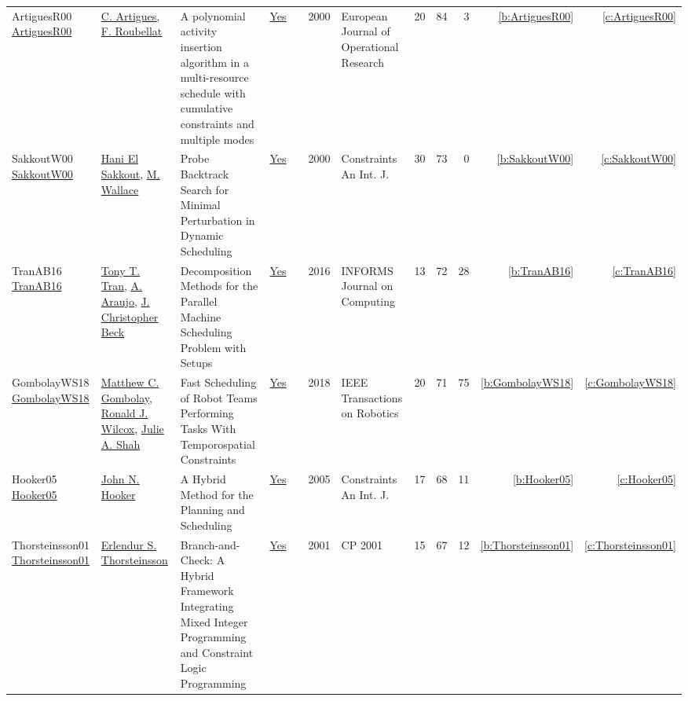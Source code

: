 {\begin{longtable}{>{\raggedright\arraybackslash}p{3cm}>{\raggedright\arraybackslash}p{6cm}>{\raggedright\arraybackslash}p{6.5cm}rrrp{2.5cm}rrrrr}
ArtiguesR00 \href{https://doi.org/10.1016/S0377-2217(99)00496-8}{ArtiguesR00} & \hyperref[auth:a6]{C. Artigues}, \hyperref[auth:a721]{F. Roubellat} & A polynomial activity insertion algorithm in a multi-resource schedule with cumulative constraints and multiple modes & \href{../works/ArtiguesR00.pdf}{Yes} & \cite{ArtiguesR00} & 2000 & European Journal of Operational Research & 20 & 84 & 3 & \ref{b:ArtiguesR00} & \ref{c:ArtiguesR00}\\
SakkoutW00 \href{https://doi.org/10.1023/A:1009856210543}{SakkoutW00} & \hyperref[auth:a168]{Hani El Sakkout}, \hyperref[auth:a117]{M. Wallace} & Probe Backtrack Search for Minimal Perturbation in Dynamic Scheduling & \href{../works/SakkoutW00.pdf}{Yes} & \cite{SakkoutW00} & 2000 & Constraints An Int. J. & 30 & 73 & 0 & \ref{b:SakkoutW00} & \ref{c:SakkoutW00}\\
TranAB16 \href{https://doi.org/10.1287/ijoc.2015.0666}{TranAB16} & \hyperref[auth:a810]{Tony T. Tran}, \hyperref[auth:a818]{A. Araujo}, \hyperref[auth:a89]{J. Christopher Beck} & Decomposition Methods for the Parallel Machine Scheduling Problem with Setups & \href{../works/TranAB16.pdf}{Yes} & \cite{TranAB16} & 2016 & INFORMS Journal on Computing & 13 & 72 & 28 & \ref{b:TranAB16} & \ref{c:TranAB16}\\
GombolayWS18 \href{http://dx.doi.org/10.1109/tro.2018.2795034}{GombolayWS18} & \hyperref[auth:a939]{Matthew C. Gombolay}, \hyperref[auth:a940]{Ronald J. Wilcox}, \hyperref[auth:a941]{Julie A. Shah} & Fast Scheduling of Robot Teams Performing Tasks With Temporospatial Constraints & \href{../works/GombolayWS18.pdf}{Yes} & \cite{GombolayWS18} & 2018 & IEEE Transactions on Robotics & 20 & 71 & 75 & \ref{b:GombolayWS18} & \ref{c:GombolayWS18}\\
Hooker05 \href{https://doi.org/10.1007/s10601-005-2812-2}{Hooker05} & \hyperref[auth:a162]{John N. Hooker} & A Hybrid Method for the Planning and Scheduling & \href{../works/Hooker05.pdf}{Yes} & \cite{Hooker05} & 2005 & Constraints An Int. J. & 17 & 68 & 11 & \ref{b:Hooker05} & \ref{c:Hooker05}\\
Thorsteinsson01 \href{https://doi.org/10.1007/3-540-45578-7\_2}{Thorsteinsson01} & \hyperref[auth:a886]{Erlendur S. Thorsteinsson} & Branch-and-Check: {A} Hybrid Framework Integrating Mixed Integer Programming and Constraint Logic Programming & \href{../works/Thorsteinsson01.pdf}{Yes} & \cite{Thorsteinsson01} & 2001 & CP 2001 & 15 & 67 & 12 & \ref{b:Thorsteinsson01} & \ref{c:Thorsteinsson01}\\
\end{longtable}
}

